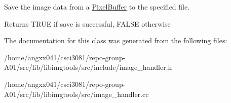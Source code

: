 Save the image data from a \hyperlink{classimage__tools_1_1PixelBuffer}{Pixel\+Buffer} to the specified file. 

\begin{DoxyReturn}{Returns}
T\+R\+UE if save is successful, F\+A\+L\+SE otherwise 
\end{DoxyReturn}


The documentation for this class was generated from the following files\+:\begin{DoxyCompactItemize}
\item 
/home/angxx041/csci3081/repo-\/group-\/\+A01/src/lib/libimgtools/src/include/image\+\_\+handler.\+h\item 
/home/angxx041/csci3081/repo-\/group-\/\+A01/src/lib/libimgtools/src/image\+\_\+handler.\+cc\end{DoxyCompactItemize}
